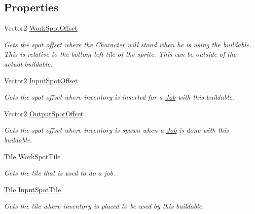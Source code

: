 \subsection*{Properties}
\begin{DoxyCompactItemize}
\item 
Vector2 \hyperlink{class_buildable_jobs_a65dd0d32fb03f04cf0fb38a484edd420}{Work\+Spot\+Offset}
\begin{DoxyCompactList}\small\item\em Gets the spot offset where the Character will stand when he is using the buildable. This is relative to the bottom left tile of the sprite. This can be outside of the actual buildable. \end{DoxyCompactList}\item 
Vector2 \hyperlink{class_buildable_jobs_a90df4c5107208eaa614604135f395caf}{Input\+Spot\+Offset}
\begin{DoxyCompactList}\small\item\em Gets the spot offset where inventory is inserted for a \hyperlink{class_job}{Job} with this buildable. \end{DoxyCompactList}\item 
Vector2 \hyperlink{class_buildable_jobs_ad42e0dc5d8bd26fa606e37bb8846ac99}{Output\+Spot\+Offset}
\begin{DoxyCompactList}\small\item\em Gets the spot offset where inventory is spawn when a \hyperlink{class_job}{Job} is done with this buildable. \end{DoxyCompactList}\item 
\hyperlink{class_tile}{Tile} \hyperlink{class_buildable_jobs_a04c116e0984a4f16eacc43437e75a971}{Work\+Spot\+Tile}
\begin{DoxyCompactList}\small\item\em Gets the tile that is used to do a job. \end{DoxyCompactList}\item 
\hyperlink{class_tile}{Tile} \hyperlink{class_buildable_jobs_afee5486dcb9dfdea6e639fe96c1ccbc3}{Input\+Spot\+Tile}
\begin{DoxyCompactList}\small\item\em Gets the tile where inventory is placed to be used by this buildable. \end{DoxyCompactList}\item 

\end{DoxyCompactItemize}
